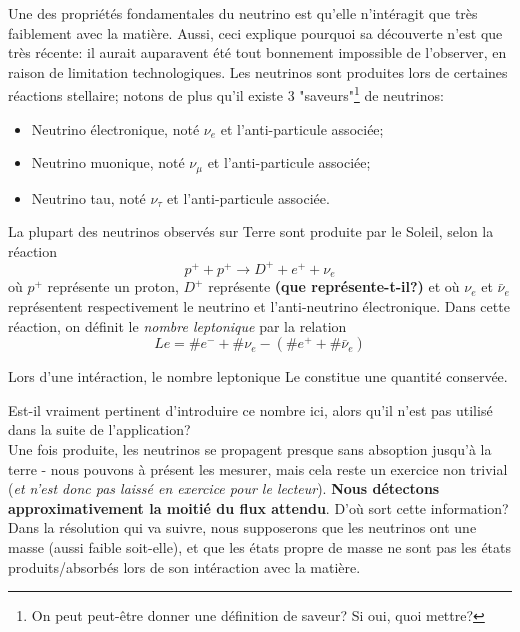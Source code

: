 \documentclass[../notesdecours.tex]{subfiles}
\begin{document}
Une des propriétés fondamentales du neutrino est qu'elle n'intéragit que très faiblement avec la matière. Aussi, ceci explique pourquoi sa découverte n'est que très récente: il aurait auparavent été tout bonnement impossible de l'observer, en raison de limitation technologiques. Les neutrinos sont produites lors de certaines réactions stellaire; notons de plus qu'il existe 3 "saveurs"\footnote{\color{red}On peut peut-être donner une définition de saveur? Si oui, quoi mettre?} de neutrinos:
\begin{itemize}
    \item Neutrino électronique, noté $\nu_e$ et l'anti-particule associée;
    \item Neutrino muonique, noté $\nu_\mu$ et l'anti-particule associée;
    \item Neutrino tau, noté $\nu_\tau$ et l'anti-particule associée.
\end{itemize}
La plupart des neutrinos observés sur Terre sont produite par le Soleil, selon la réaction
\begin{equation}\label{eq:reaction neutrino}
    p^+ + p^+ \longrightarrow D^+ + e^+ + \nu_e
\end{equation}
où $p^+$ représente un proton, $D^+$ représente \color{red}\textbf{(que représente-t-il?)} \color{black} et où $\nu_e$ et $\bar{\nu}_e$ représentent respectivement le neutrino et l'anti-neutrino électronique. Dans cette réaction, on définit le \textit{nombre leptonique} par la relation
\begin{equation}
    Le = \#e^- + \#\nu_e - (\#e^++\#\bar{\nu}_e)
\end{equation}
\begin{Property}
    Lors d'une intéraction, le nombre leptonique Le constitue une quantité conservée.
\end{Property}

\color{red} Est-il vraiment pertinent d'introduire ce nombre ici, alors qu'il n'est pas utilisé dans la suite de l'application? \color{black}\\

Une fois produite, les neutrinos se propagent presque sans absoption jusqu'à la terre - nous pouvons à présent les mesurer, mais cela reste un exercice non trivial (\textit{et n'est donc pas laissé en exercice pour le lecteur}). \textbf{Nous détectons approximativement la moitié du flux attendu}. \color{red} D'où sort cette information? \color{black} Dans la résolution qui va suivre, nous supposerons que les neutrinos ont une masse (aussi faible soit-elle), et que les états propre de masse ne sont pas les états produits/absorbés lors de son intéraction avec la matière.
\end{document}
